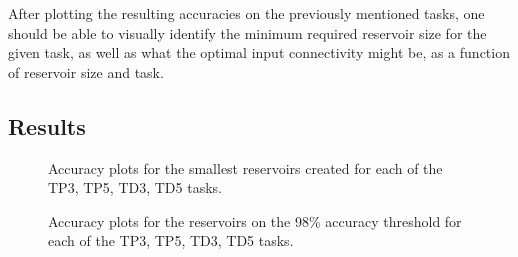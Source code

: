 After plotting the resulting accuracies on the previously mentioned tasks,
one should be able to visually identify the minimum required reservoir size for the given task,
as well as what the optimal input connectivity might be, as a function of reservoir size and task.

\label{experiments:1:results}
\subsection{Results}

\begin{figure}[ht]
    \centering
    \caption{Accuracy plots for the smallest reservoirs created for each of the TP3, TP5, TD3, TD5 tasks.}

    \label{fig:accuracy-min-size}
    \resizebox{\textwidth}{!}{
        \subfloat[TP3, N=10]{
            
        }
        \subfloat[TP5, N=10]{
            
        }
    }
    \resizebox{\textwidth}{!}{
        \subfloat[TD3, N=5]{
            
        }
        \subfloat[TD5, N=10]{
            
        }
    }
\end{figure}

\begin{figure}[ht]
    \centering
    \caption{Accuracy plots for the reservoirs on the 98\% accuracy threshold for each of the TP3, TP5, TD3, TD5 tasks.}

    \label{fig:accuracy-threshold-size}
    \resizebox{\textwidth}{!}{
        \subfloat[TP3, N=20]{
            
        }
        \subfloat[TP5, N=90]{
            
        }
    }
    \resizebox{\textwidth}{!}{
        \subfloat[TD3, N=10]{
            
        }
        \subfloat[TD5, N=55]{
            
        }
    }
\end{figure}

